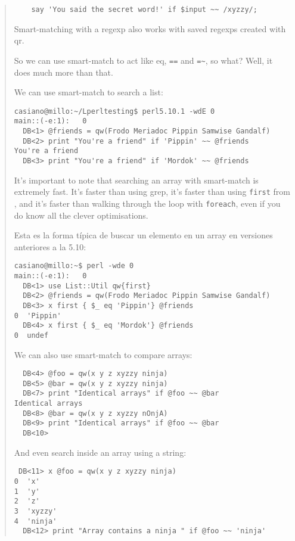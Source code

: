 \begin{it}
\begin{quotation}
\begin{verbatim}
    say 'You said the secret word!' if $input ~~ /xyzzy/;
\end{verbatim}

Smart-matching with a regexp also works with saved regexps created with qr{}.

So we can use smart-match to act like eq, \verb|==| and 
\verb|=~|, so what? Well, it does much more than that. 

We can use smart-match to search a list:

\begin{verbatim}
casiano@millo:~/Lperltesting$ perl5.10.1 -wdE 0
main::(-e:1):   0
  DB<1> @friends = qw(Frodo Meriadoc Pippin Samwise Gandalf)
  DB<2> print "You're a friend" if 'Pippin' ~~ @friends
You're a friend
  DB<3> print "You're a friend" if 'Mordok' ~~ @friends

\end{verbatim}

It's important to note that searching an array with smart-match is
extremely fast. It's faster than using grep, it's faster than using
\verb|first| from , and it's faster than walking through the loop
with \verb|foreach|, even if you do know all the clever optimisations.

Esta es la forma típica de buscar un elemento en un array en 
versiones anteriores a la 5.10:
\begin{verbatim}
casiano@millo:~$ perl -wde 0
main::(-e:1):   0
  DB<1> use List::Util qw{first}
  DB<2> @friends = qw(Frodo Meriadoc Pippin Samwise Gandalf)
  DB<3> x first { $_ eq 'Pippin'} @friends
0  'Pippin'
  DB<4> x first { $_ eq 'Mordok'} @friends
0  undef
\end{verbatim}

We can also use smart-match to compare arrays:

\begin{verbatim}
  DB<4> @foo = qw(x y z xyzzy ninja)
  DB<5> @bar = qw(x y z xyzzy ninja)
  DB<7> print "Identical arrays" if @foo ~~ @bar
Identical arrays
  DB<8> @bar = qw(x y z xyzzy nOnjA)
  DB<9> print "Identical arrays" if @foo ~~ @bar
  DB<10>     
\end{verbatim}

And even search inside an array using a string:

\begin{verbatim}
 DB<11> x @foo = qw(x y z xyzzy ninja)
0  'x'
1  'y'
2  'z'
3  'xyzzy'
4  'ninja'
  DB<12> print "Array contains a ninja " if @foo ~~ 'ninja'
\end{verbatim}


\end{quotation}
\end{it}

